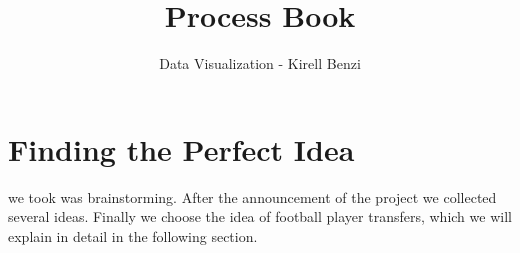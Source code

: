 \documentclass[a4paper]{tufte-book}
\title{Process Book}
\author{Data Visualization - Kirell Benzi}
\begin{document}
\maketitle

\tableofcontents
\listoffigures
\listoftables

\mainmatter


\chapter{Finding the Perfect Idea}
\label{ch:idea}

 we took was brainstorming. After the announcement of the project we collected several ideas. Finally we choose the idea of football player transfers, which we will explain in detail in the following section.
\end{document}
